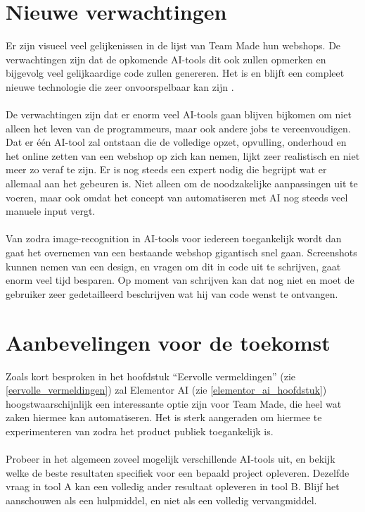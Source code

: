 \section{Nieuwe verwachtingen}
Er zijn visueel veel gelijkenissen in de lijst van Team Made hun webshops. De verwachtingen zijn dat de opkomende AI-tools dit ook zullen opmerken en bijgevolg veel gelijkaardige code zullen genereren. Het is en blijft een compleet nieuwe technologie die zeer onvoorspelbaar kan zijn \autocite{KnorrEvans2023}.
\\\\
De verwachtingen zijn dat er enorm veel AI-tools gaan blijven bijkomen om niet alleen het leven van de programmeurs, maar ook andere jobs te vereenvoudigen. Dat er één AI-tool zal ontstaan die de volledige opzet, opvulling, onderhoud en het online zetten van een webshop op zich kan nemen, lijkt zeer realistisch en niet meer zo veraf te zijn. Er is nog steeds een expert nodig die begrijpt wat er allemaal aan het gebeuren is. Niet alleen om de noodzakelijke aanpassingen uit te voeren, maar ook omdat het concept van automatiseren met AI nog steeds veel manuele input vergt. 
\\\\
Van zodra image-recognition in AI-tools voor iedereen toegankelijk wordt dan gaat het overnemen van een bestaande webshop gigantisch snel gaan. Screenshots kunnen nemen van een design, en vragen om dit in code uit te schrijven, gaat enorm veel tijd besparen. Op moment van schrijven kan dat nog niet en moet de gebruiker zeer gedetailleerd beschrijven wat hij van code wenst te ontvangen.
\section{Aanbevelingen voor de toekomst}
Zoals kort besproken in het hoofdstuk “Eervolle vermeldingen” (zie \ref{eervolle_vermeldingen}) zal Elementor AI (zie \ref{elementor_ai_hoofdstuk}) hoogstwaarschijnlijk een interessante optie zijn voor Team Made, die heel wat zaken hiermee kan automatiseren. Het is sterk aangeraden om hiermee te experimenteren van zodra het product publiek toegankelijk is.
\\\\
Probeer in het algemeen zoveel mogelijk verschillende AI-tools uit, en bekijk welke de beste resultaten specifiek voor een bepaald project opleveren. Dezelfde vraag in tool A kan een volledig ander resultaat opleveren in tool B. Blijf het aanschouwen als een hulpmiddel, en niet als een volledig vervangmiddel.

